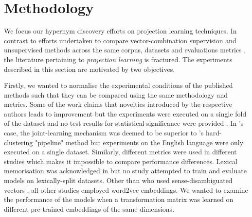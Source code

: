 \chapter{Methodology}

We focus our hypernym discovery efforts on projection learning techniques.  In contrast to efforts undertaken to compare vector-combination supervision and unsupervised methods across the same corpus, datasets and evaluations metrics \citep{shwartz2017siege, roller2014inclusive, levy2015supervised}, the literature pertaining to \textit{projection learning} is fractured.  The experiments described in this section are motivated by two objectives.  

Firstly, we wanted to normalise the experimental conditions of the published methods such that they can be compared using the same methodology and metrics.  Some of the work claims that novelties introduced by the respective authors leads to improvement but the experiments were executed on a single fold of the dataset and no test results for statistical significance were provided \citep{Fu2014, ustalov2017negative, yamane2016distributional}.  In \citep{yamane2016distributional}'s case, the joint-learning mechanism was deemed to be superior to \citep{Fu2014}'s hard-clustering "pipeline" method but experiments on the English language were only executed on a single dataset.  Similarly, different metrics were used in different studies which makes it impossible to compare performance differences.  Lexical memorisation was acknowledged in \citep{espinosa2016supervised} but no study attempted to train and evaluate models on lexically-split datasets.  Other than \citep{espinosa2016supervised} who used sense-disambiguated vectors \citep{iacobacci2015sensembed}, all other studies employed word2vec embeddings.  We wanted to examine the performance of the models when a transformation matrix was learned on different pre-trained embeddings of the same dimensions.  

